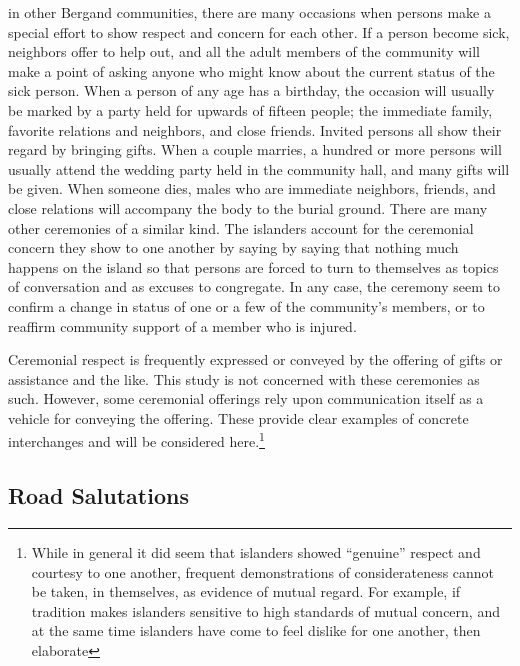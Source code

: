\documentclass[openany,nobib]{tufte-book}
\begin{document}
in other Bergand communities, there are many
occasions when persons make a special effort to show respect and concern
for each other. If a person become sick, neighbors offer to help out,
and all the adult members of the community will make a point of asking
anyone who might know about the current status of the sick person. When
a person of any age has a birthday, the occasion will usually be marked
by a party held for upwards of fifteen people; the immediate family,
favorite relations and neighbors, and close friends. Invited persons all
show their regard by bringing gifts. When a couple marries, a hundred or
more persons will usually attend the wedding party held in the community
hall, and many gifts will be given. When someone dies, males who are
immediate neighbors, friends, and close relations will accompany the
body to the burial ground. There are many other ceremonies of a similar
kind. The islanders account for the ceremonial concern they show to one
another by saying by saying that nothing much happens on the island so
that persons are forced to turn to themselves as topics of conversation
and as excuses to congregate. In any case, the ceremony seem to confirm
a change in status of one or a few of the community's members, or to
reaffirm community support of a member who is injured.

Ceremonial respect is frequently expressed or conveyed by the offering
of gifts or assistance and the like. This study is not concerned with
these ceremonies as such. However, some ceremonial offerings rely upon
communication itself as a vehicle for conveying the offering. These
provide clear examples of concrete interchanges and will be considered
here.\footnote{While in general it did seem that islanders showed
  ``genuine'' respect and courtesy to one another, frequent
  demonstrations of considerateness cannot be taken, in themselves, as
  evidence of mutual regard. For example, if tradition makes islanders
  sensitive to high standards of mutual concern, and at the same time
  islanders have come to feel dislike for one another, then elaborate}

\hypertarget{road-salutations}{%
\subsection{Road Salutations}\label{road-salutations}}
\end{document}
